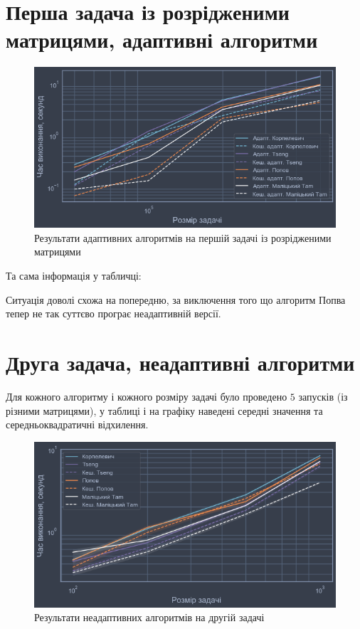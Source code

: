 \section{Перша задача із розрідженими матрицями, адаптивні алгоритми}

\begin{figure}[H]
    \centering
    \includegraphics[width=\textwidth]{img/1/sparse/adapt/time.png}
    \caption{Результати адаптивних алгоритмів на першій задачі із розрідженими матрицями}
\end{figure}

Та сама інформація у табличці:





Ситуація доволі схожа на попередню, за виключення того що алгоритм Попва тепер не так суттєво програє неадаптивній версії.

\section{Друга задача, неадаптивні алгоритми}

Для кожного алгоритму і кожного розміру задачі було проведено $5$ запусків (із різними матрицями), у таблиці і на графіку наведені середні значення та середньоквадратичні відхилення.

\begin{figure}[H]
    \centering
    \includegraphics[width=\textwidth]{img/2/time.png}
    \caption{Результати неадаптивних алгоритмів на другій задачі}
\end{figure}

